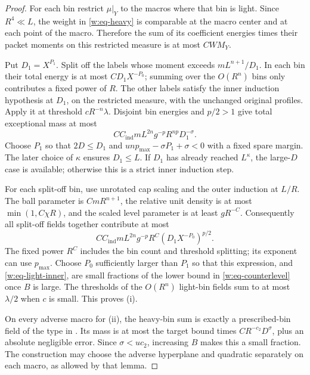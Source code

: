 \begin{proof}
For each bin restrict $\mu|_Y$ to the macros where that bin is light.
Since $R^4\ll L$, the weight in \eqref{w:eq-heavy} is comparable at
the macro center and at each point of the macro.  Therefore the sum of
its coefficient energies times their packet moments on this restricted
measure is at most $CWM_Y$.

Put $D_1=X^{P_1}$.  Split off the labels whose moment exceeds
$mL^{n+1}/D_1$.  In each bin their total energy is at most
$CD_1X^{-P_0}$; summing over the $O(R^n)$ bins only contributes a fixed
power of $R$.  The other labels satisfy the inner induction hypothesis
at $D_1$, on the restricted measure, with the unchanged original
profiles.  Apply it at threshold $cR^{-n}\lambda$.  Disjoint bin
energies and $p/2>1$ give total exceptional mass at most
\begin{equation}\label{w:eq-light-inner}
 C C_{\mathrm{ind}}mL^{2n}g^{-p}R^{np}D_1^{-\sigma}.
\end{equation}
Choose $P_1$ so that $2D\leq D_1$ and
$un p_{\max}-\sigma P_1+\sigma<0$ with a fixed spare margin.
The later choice of $\kappa$ ensures $D_1\leq L$.  If $D_1$ has
already reached $L^\kappa$, the large-$D$ case is available; otherwise
this is a strict inner induction step.

For each split-off bin, use unrotated cap scaling and the outer
induction at $L/R$.  The ball parameter is $CmR^{n+1}$, the relative
unit density is at most $\min(1,C\chi R)$, and the scaled level
parameter is at least $gR^{-C}$.  Consequently all split-off fields
together contribute at most
\begin{equation}\label{w:eq-light-outer}
 C C_{\mathrm{ind}}mL^{2n}g^{-p}
 R^C(D_1X^{-P_0})^{p/2}.
\end{equation}
The fixed power $R^C$ includes the bin count and threshold splitting;
its exponent can use $p_{\max}$.  Choose $P_0$ sufficiently larger
than $P_1$ so that this expression, and \eqref{w:eq-light-inner}, are
small fractions of the lower bound in \eqref{w:eq-counterlevel} once
$B$ is large.  The thresholds of the $O(R^n)$ light-bin fields sum to
at most $\lambda/2$ when $c$ is small.  This proves \textup{(i)}.

On every adverse macro for \textup{(ii)}, the heavy-bin sum is exactly
a prescribed-bin field of the type in .  Its mass is
at most the target bound times $CR^{-c_2}D^\sigma$, plus an absolute
negligible error.  Since $\sigma<uc_2$, increasing $B$ makes this a
small fraction.  The construction may choose the adverse hyperplane
and quadratic separately on each macro, as allowed by that lemma.


\end{proof}
